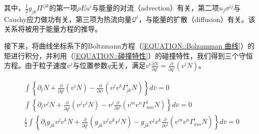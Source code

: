 \documentclass[LBMDerivation.tex]{subfiles}
\begin{document}
其中，$\frac{1}{2} g_{jk}\Pi^{i j k}$的第一项$\rho  E u^i$与能量的对流（advection）有关，第二项$u_j \sigma^{ij}$与Cauchy应力做功有关，第三项为热流向量$\mathcal{Q}^i$，与能量的扩散（diffusion）有关。该关系将被用于能量方程的推导。

%

接下来，将曲线坐标系下的Boltzmann方程（\ref{EQUATION::Bolzamman 曲线}）的矩进行积分，并利用（\ref{EQUATION::碰撞特性}）的碰撞特性，我们得到三个守恒方程。由于粒子速度$v^j$与位置参数$q$无关，满足$v^i \frac{\partial N}{\partial q^i}=\frac{\partial}{\partial q^i}(v^i N)$。

%
%




\begin{equation}
  \begin{aligned}
     & \int  \left\{\partial_{t} N+\frac{\partial}{\partial q^{i}}\left(v^{i} N\right)-\frac{\partial}{\partial v^{i}}\left( v^{j} v^{k} \Gamma_{j k}^{i} N\right)   \right\}d\bar{v}=0                                                                   \\
     & \int \left\{\partial_{t}  v^{j} N+\frac{\partial}{\partial q^{i}}\left( v^{j} v^{i} N\right)-v^{j}\frac{\partial}{\partial v^{l}}\left(  v^{m} v^{n} \Gamma_{mn}^{l} N\right)    \right\}d \bar{v}=0                                               \\
     & \frac{1}{2}\int \left\{\partial_{t} g_{jk} v^{j}v^{k} N+ \frac{\partial}{\partial q^{i}}\left( g_{jk}v^{j} v^{k} v^{i} N\right)- g_{jk} v^{j}v^{k}  \frac{\partial}{\partial v^{i}}\left( v^{m} v^{n} \Gamma_{mn}^{i} N\right) \right\}d \bar{v}=0 \\
  \end{aligned}
  \label{EQUATION::A.12} ~
\end{equation}
%


%
\end{document}
